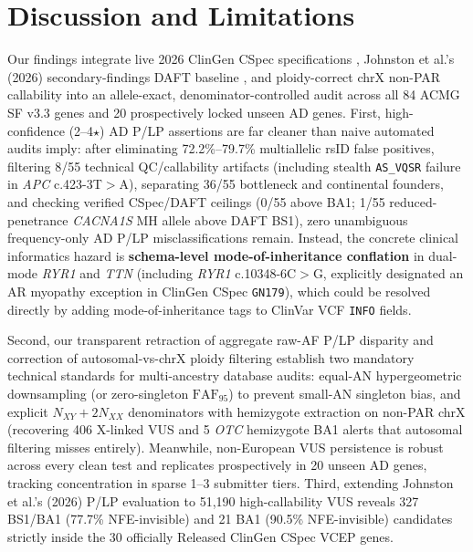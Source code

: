 \documentclass[11pt,letterpaper]{article}
\begin{document}
\section{Discussion and Limitations}
Our findings integrate live 2026 ClinGen CSpec specifications \citep{clingencspec2026}, Johnston et al.'s (2026) secondary-findings DAFT baseline \citep{johnston2026daft}, and ploidy-correct chrX non-PAR callability \citep{gnomadv41sex2024} into an allele-exact, denominator-controlled audit across all 84 ACMG SF v3.3 genes and 20 prospectively locked unseen AD genes. First, high-confidence (2--4$\star$) AD P/LP assertions are far cleaner than naive automated audits imply: after eliminating 72.2\%--79.7\% multiallelic rsID false positives, filtering 8/55 technical QC/callability artifacts (including stealth \texttt{AS\_VQSR} failure in \textit{APC} c.423-3T$>$A), separating 36/55 bottleneck and continental founders, and checking verified CSpec/DAFT ceilings (0/55 above BA1; 1/55 reduced-penetrance \textit{CACNA1S} MH allele above DAFT BS1), zero unambiguous frequency-only AD P/LP misclassifications remain. Instead, the concrete clinical informatics hazard is \textbf{schema-level mode-of-inheritance conflation} in dual-mode \textit{RYR1} and \textit{TTN} (including \textit{RYR1} c.10348-6C$>$G, explicitly designated an AR myopathy exception in ClinGen CSpec \texttt{GN179}), which could be resolved directly by adding mode-of-inheritance tags to ClinVar VCF \texttt{INFO} fields.

Second, our transparent retraction of aggregate raw-AF P/LP disparity and correction of autosomal-vs-chrX ploidy filtering establish two mandatory technical standards for multi-ancestry database audits: equal-AN hypergeometric downsampling (or zero-singleton $\mathrm{FAF}_{95}$) to prevent small-AN singleton bias, and explicit $N_{XY}+2N_{XX}$ denominators with hemizygote extraction on non-PAR chrX (recovering 406 X-linked VUS and 5 \textit{OTC} hemizygote BA1 alerts that autosomal filtering misses entirely). Meanwhile, non-European VUS persistence is robust across every clean test and replicates prospectively in 20 unseen AD genes, tracking concentration in sparse 1--3 submitter tiers. Third, extending Johnston et al.'s (2026) P/LP evaluation to 51,190 high-callability VUS reveals 327 BS1/BA1 (77.7\% NFE-invisible) and 21 BA1 (90.5\% NFE-invisible) candidates strictly inside the 30 officially Released ClinGen CSpec VCEP genes.
\end{document}
